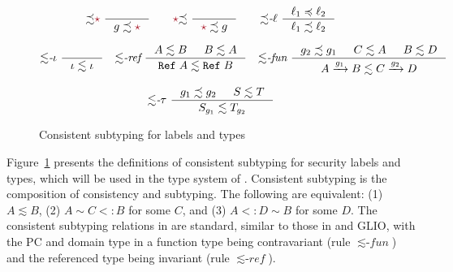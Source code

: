 \begin{figure}[ht]
  \raggedright
  \begin{gather*}
    {\precsim}\unk~
    \inference{}{g \precsim \unk}
    \qquad
    \unk{\precsim}~
    \inference{}{\unk \precsim g}
    \qquad
        {\precsim}\textit{-}\ell~
        \inference{\ell_1 \preccurlyeq \ell_2}{\ell_1 \precsim \ell_2}
  \end{gather*}
  \raggedright
  \begin{gather*}
          {\lesssim}\textit{-}\iota~
          \inference{}{\iota \lesssim \iota}
          \quad
              {\lesssim}\textit{-ref}~
              \inference{A \lesssim B & B \lesssim A}{\Refer{A} \lesssim \Refer{B}} \quad
                        {\lesssim}\textit{-fun}~
                        \inference{g_2 \precsim g_1 & C \lesssim A & B \lesssim D}
                                  {\Fun{A}{g_1}{B} \lesssim \Fun{C}{g_2}{D}}
  \end{gather*}
  \raggedright
  \begin{gather*}
    {\lesssim}\textit{-}\tau~
    \inference{g_1 \precsim g_2 & S \lesssim T}{S_{g_1} \lesssim T_{g_2}}
  \end{gather*}
  \caption{Consistent subtyping for labels and types}
  \label{fig:consis-sub}
\end{figure}

Figure~\ref{fig:consis-sub} presents the definitions of consistent subtyping for
security labels and types, which will be used in the type system of \Surface.
Consistent subtyping is the composition of consistency and subtyping. The
following are equivalent: (1) $A \lesssim B$, (2) $A \sim C <: B$ for some $C$,
and (3) $A <: D \sim B$ for some $D$. The consistent subtyping relations in
\Surface are standard, similar to those in \GSLRef and GLIO, with the PC and
domain type in a function type being contravariant (rule
${\lesssim}\textit{-fun}$) and the referenced type being invariant
(rule ${\lesssim}\textit{-ref}$).

